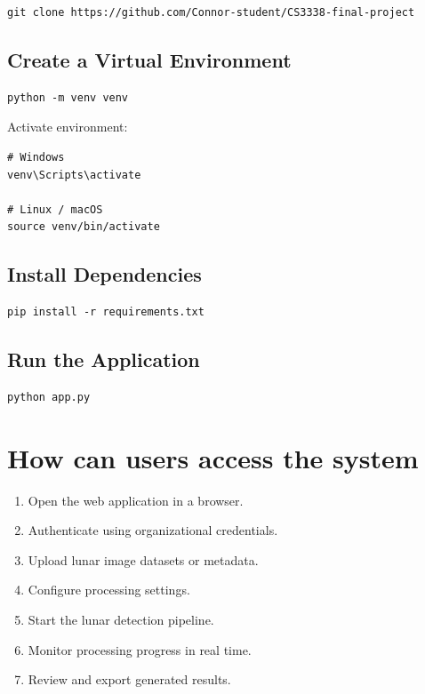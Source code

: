 \documentclass[12pt]{article}
\begin{document}
\begin{verbatim}
git clone https://github.com/Connor-student/CS3338-final-project
\end{verbatim}

\subsection{Create a Virtual Environment}

\begin{verbatim}
python -m venv venv
\end{verbatim}

Activate environment:

\begin{verbatim}
# Windows
venv\Scripts\activate

# Linux / macOS
source venv/bin/activate
\end{verbatim}

\subsection{Install Dependencies}

\begin{verbatim}
pip install -r requirements.txt
\end{verbatim}

\subsection{Run the Application}

\begin{verbatim}
python app.py
\end{verbatim}

\section{How can users access the system}

\begin{enumerate}
    \item Open the web application in a browser.
    \item Authenticate using organizational credentials.
    \item Upload lunar image datasets or metadata.
    \item Configure processing settings.
    \item Start the lunar detection pipeline.
    \item Monitor processing progress in real time.
    \item Review and export generated results.
\end{enumerate}
\end{document}

